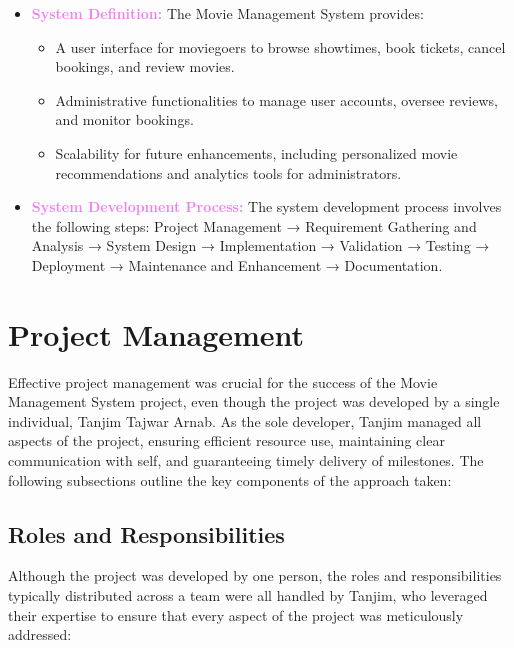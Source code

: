 \documentclass[a4paper,12pt]{article}  %
\renewcommand{\textbf}[1]{\textcolor{violet}{\bfseries #1}}
\begin{document}
\begin{itemize}
    \item \textbf{System Definition:}  
    The Movie Management System provides:  
    \begin{itemize}
        \item A user interface for moviegoers to browse showtimes, book tickets, cancel bookings, and review movies.  
        \item Administrative functionalities to manage user accounts, oversee reviews, and monitor bookings.  
        \item Scalability for future enhancements, including personalized movie recommendations and analytics tools for administrators.  
    \end{itemize}  




 
 \item \textbf{System Development Process:} The system development process involves the following steps:
 Project Management → Requirement Gathering and Analysis → System Design → Implementation → Validation → Testing → Deployment → Maintenance and Enhancement → Documentation.

     
\end{itemize}


\clearpage



\section{Project Management} \label{sec:projectmanagement}


Effective project management was crucial for the success of the Movie Management System project, even though the project was developed by a single individual, Tanjim Tajwar Arnab. As the sole developer, Tanjim managed all aspects of the project, ensuring efficient resource use, maintaining clear communication with self, and guaranteeing timely delivery of milestones. The following subsections outline the key components of the approach taken:

\subsection{Roles and Responsibilities}
Although the project was developed by one person, the roles and responsibilities typically distributed across a team were all handled by Tanjim, who leveraged their expertise to ensure that every aspect of the project was meticulously addressed:
\end{document}
